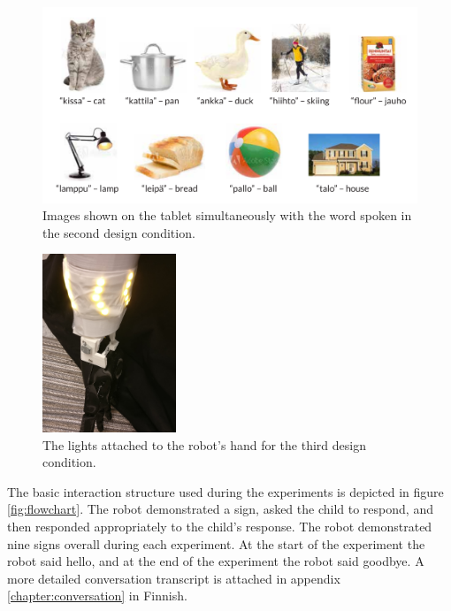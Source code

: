 \begin{figure}
\centering
  \includegraphics[width=\linewidth]{images/tablet_images.pdf}
  \caption{Images shown on the tablet simultaneously with the word spoken in the second design condition.}
  \label{fig:tabletimages}
\end{figure}

\begin{figure}
\centering
  \includegraphics[width=4cm]{images/lights.jpg}
  \caption{The lights attached to the robot's hand for the third design condition.}
  \label{fig:lights}
\end{figure}

The basic interaction structure used during the experiments is depicted in figure \ref{fig:flowchart}. The robot demonstrated a sign, asked the child to respond, and then responded appropriately to the child's response. The robot demonstrated nine signs overall during each experiment. At the start of the experiment the robot said hello, and at the end of the experiment the robot said goodbye. A more detailed conversation transcript is attached in appendix \ref{chapter:conversation} in Finnish.

